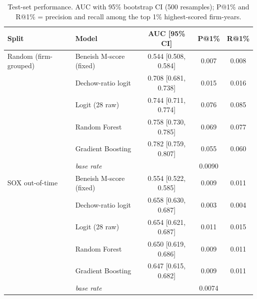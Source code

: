 \begin{table}[t]
\centering
\small
\caption{Test-set performance. AUC with 95\% bootstrap CI (500 resamples); P@1\% and R@1\% = precision and recall among the top 1\% highest-scored firm-years.}
\label{tab:results}
\begin{tabular}{llccc}
\toprule
Split & Model & AUC [95\% CI] & P@1\% & R@1\% \\
\midrule
Random (firm-grouped) & Beneish M-score (fixed) & 0.544 [0.508, 0.584] & 0.007 & 0.008 \\
 & Dechow-ratio logit & 0.708 [0.681, 0.738] & 0.015 & 0.016 \\
 & Logit (28 raw) & 0.744 [0.711, 0.774] & 0.076 & 0.085 \\
 & Random Forest & 0.758 [0.730, 0.785] & 0.069 & 0.077 \\
 & Gradient Boosting & 0.782 [0.759, 0.807] & 0.055 & 0.060 \\
 & \textit{base rate} & & 0.0090 & \\
\midrule
SOX out-of-time & Beneish M-score (fixed) & 0.554 [0.522, 0.585] & 0.009 & 0.011 \\
 & Dechow-ratio logit & 0.658 [0.630, 0.687] & 0.003 & 0.004 \\
 & Logit (28 raw) & 0.654 [0.621, 0.687] & 0.011 & 0.015 \\
 & Random Forest & 0.650 [0.619, 0.686] & 0.009 & 0.011 \\
 & Gradient Boosting & 0.647 [0.615, 0.682] & 0.009 & 0.011 \\
 & \textit{base rate} & & 0.0074 & \\
\bottomrule
\end{tabular}
\end{table}
